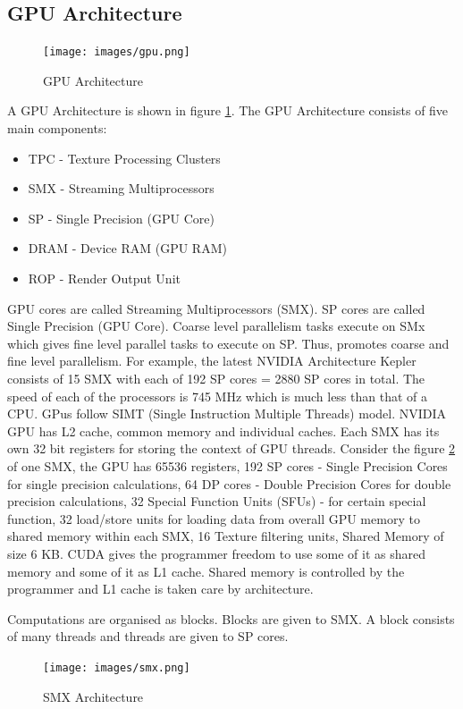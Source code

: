 \documentclass[12pt]{book}
\begin{document}
\subsection{GPU Architecture}
\begin{figure}[H]
    \centering
    \texttt{[image: images/gpu.png]}
    \caption{GPU Architecture}
    \label{fig:gpu}
\end{figure}
A GPU Architecture is shown in figure \ref{fig:gpu}.
The GPU Architecture consists of five main components:
\begin{itemize}
    \item TPC - Texture Processing Clusters
    \item SMX - Streaming Multiprocessors
    \item SP - Single Precision (GPU Core)
    \item DRAM - Device RAM (GPU RAM)
    \item ROP - Render Output Unit
\end{itemize}
GPU cores are called Streaming Multiprocessors (SMX).
SP cores are called Single Precision (GPU Core).
Coarse level parallelism tasks execute on SMx which gives fine level parallel tasks to execute on SP.
Thus, promotes coarse and fine level parallelism. For example, the latest NVIDIA Architecture 
Kepler consists of 15 SMX with each of 192 SP cores = 2880 SP cores in total.
The speed of each of the processors is 745 MHz which is much less than that of a CPU.
GPus follow SIMT (Single Instruction Multiple Threads) model.
NVIDIA GPU has L2 cache, common memory and individual caches. Each SMX has its own 32 bit registers
for storing the context of GPU threads. 
Consider the figure \ref{fig:smx} of one SMX, 
the GPU has 65536 registers, 192 SP cores - Single Precision Cores for single precision calculations,
64 DP cores - Double Precision Cores for double precision calculations, 32 Special Function Units (SFUs) -
for certain special function, 32 load/store units for loading data from overall GPU memory to shared memory within 
each SMX, 16 Texture filtering units, Shared Memory of size 6 KB. CUDA gives the programmer freedom to use some of it as shared memory
and some of it as L1 cache. Shared memory is controlled by the programmer and L1 cache is taken care by architecture.

Computations are organised as blocks. Blocks are given to SMX. A block consists of many threads and threads are given to SP cores.
\begin{figure}[H]
    \centering
    \texttt{[image: images/smx.png]}
    \caption{SMX Architecture}
    \label{fig:smx}
\end{figure}
\end{document}
